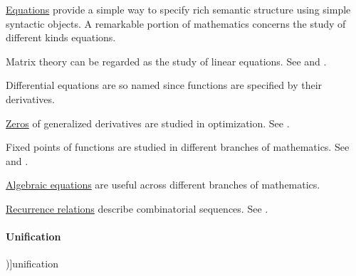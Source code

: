 \begin{example}\label{ex:def:equation}
  \hyperref[def:equation]{Equations} provide a simple way to specify rich semantic structure using simple syntactic objects. A remarkable portion of mathematics concerns the study of different kinds equations.

  \begin{thmenum}
     Matrix theory can be regarded as the study of linear equations. See  and .

     Differential equations are so named since functions are specified by their derivatives.

     \hyperref[def:zero_of_function]{Zeros} of generalized derivatives are studied in optimization. See .

     Fixed points of functions are studied in different branches of mathematics. See  and .

     \hyperref[def:algebraic_equation]{Algebraic equations} are useful across different branches of mathematics.

     \hyperref[def:recurrence_relations]{Recurrence relations} describe combinatorial sequences. See .
  \end{thmenum}
\end{example}

\paragraph{Unification}

\begin{concept}\label{con:unification}
  \term[en=unification, ru=унификация (\cite[152]{Герасимов2011Вычислимость})]{unification}
  \todo{}
\end{concept}
